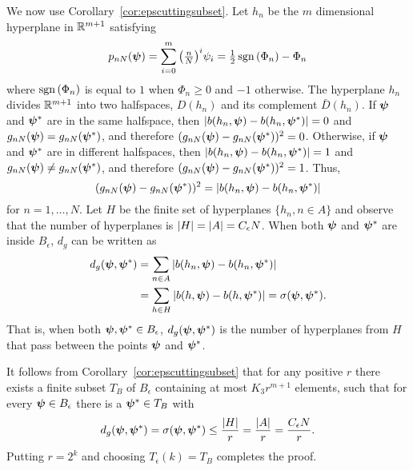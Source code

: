 \documentclass[journal]{IEEEtran}
\begin{document}
\begin{IEEEproof}
We now use Corollary~\ref{cor:epscuttingsubset}.  Let $h_n$ be the $m$ dimensional hyperplane in ${\mathbb R}^{m+1}$ satisfying
\[
p_{nN}(\boldsymbol{\psi}) =  \sum_{i=0}^{m} \big(\tfrac{n}{N}\big)^i \psi_i = \tfrac{1}{2} \operatorname{sgn}\left( \Phi_n \right) - \Phi_n
\]
where $\operatorname{sgn}\left( \Phi_n \right)$ is equal to $1$ when $\Phi_n \geq 0$ and $-1$ otherwise.  The hyperplane $h_n$ divides ${\mathbb R}^{m+1}$ into two halfspaces, $D(h_n)$ and its complement $\bar{D}(h_n)$.  If $\boldsymbol{\psi}$ and $\boldsymbol{\psi}^*$ are in the same halfspace, then $\left\vert  b(h_n,\boldsymbol{\psi}) - b(h_n,\boldsymbol{\psi}^*)  \right\vert = 0$ and $g_{nN}(\boldsymbol{\psi}) = g_{nN}(\boldsymbol{\psi}^*)$, and therefore $( g_{nN}(\boldsymbol{\psi}) - g_{nN}(\boldsymbol{\psi}^*) )^2 = 0$.  Otherwise, if $\boldsymbol{\psi}$ and $\boldsymbol{\psi}^*$ are in different halfspaces, then $\left\vert  b(h_n,\boldsymbol{\psi}) - b(h_n,\boldsymbol{\psi}^*)  \right\vert = 1$ and $g_{nN}(\boldsymbol{\psi}) \neq g_{nN}(\boldsymbol{\psi}^*)$, and therefore $( g_{nN}(\boldsymbol{\psi}) - g_{nN}(\boldsymbol{\psi}^*) )^2 = 1$.  Thus, 
\[
(g_{nN}(\boldsymbol{\psi}) - g_{nN}(\boldsymbol{\psi}^*) )^2 = \left\vert  b(h_n,\boldsymbol{\psi}) - b(h_n,\boldsymbol{\psi}^*)  \right\vert
\]
for $n = 1, \dots,  N$.  Let $H$ be the finite set of hyperplanes $\{ h_n, n \in A\}$ and observe that the number of hyperplanes is $\left\vert H \right\vert = \left\vert A \right\vert = C_\epsilon N$.  When both $\boldsymbol{\psi}$ and $\boldsymbol{\psi}^*$ are inside $B_\epsilon$, $d_g$ can be written as
\begin{align*}
d_g(\boldsymbol{\psi}, \boldsymbol{\psi}^*) &= \sum_{n\in A} \left\vert  b(h_n,\boldsymbol{\psi}) - b(h_n,\boldsymbol{\psi}^*)  \right\vert \\
&=  \sum_{h \in H} \left\vert  b(h,\boldsymbol{\psi}) - b(h,\boldsymbol{\psi}^*)  \right\vert = \sigma(\boldsymbol{\psi}, \boldsymbol{\psi}^*).
\end{align*}
That is, when both $\boldsymbol{\psi}, \boldsymbol{\psi}^* \in B_\epsilon$, $d_g(\boldsymbol{\psi}, \boldsymbol{\psi}^*)$ is the number of hyperplanes from $H$ that pass between the points $\boldsymbol{\psi}$ and $\boldsymbol{\psi}^*$.  

It follows from Corollary~\ref{cor:epscuttingsubset} that for any positive $r$ there exists a finite subset $T_B$ of $B_\epsilon$ containing at most $K_3 r^{m+1}$ elements, such that for every $\boldsymbol{\psi} \in B_\epsilon$ there is a $\boldsymbol{\psi}^* \in T_B$ with 
\[
d_g(\boldsymbol{\psi}, \boldsymbol{\psi}^*) = \sigma(\boldsymbol{\psi}, \boldsymbol{\psi}^*) \leq \frac{\left\vert H \right\vert}{r} = \frac{\left\vert A \right\vert}{r} = \frac{C_\epsilon N}{r}.
\]
Putting $r = 2^k$ and choosing $T_\epsilon(k) = T_B$ completes the proof.
\end{IEEEproof}
 
 
\end{document}
